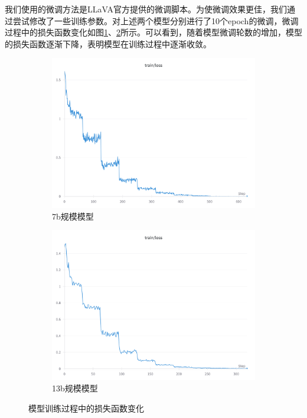 \documentclass[
    linespread = 1.25
]{ctexart}
\begin{document}
我们使用的微调方法是LLaVA官方提供的微调脚本。为使微调效果更佳，我们通过尝试修改了一些训练参数。对上述两个模型分别进行了10个epoch的微调，微调过程中的损失函数变化如图\ref{fig:7b规模模型训练过程中的loss}、\ref{fig:13b规模模型训练过程中的loss}所示。可以看到，随着模型微调轮数的增加，模型的损失函数逐渐下降，表明模型在训练过程中逐渐收敛。
\begin{figure}[H]
  \centering
  \begin{subfigure}{0.49\textwidth}
    \includegraphics[width=\textwidth]{7b.png}
    \caption{7b规模模型}
    \label{fig:7b规模模型训练过程中的loss}
  \end{subfigure}
  \hfill
  \begin{subfigure}{0.49\textwidth}
    \includegraphics[width=\textwidth]{13b.png}
    \caption{13b规模模型}
    \label{fig:13b规模模型训练过程中的loss}
  \end{subfigure}
  \caption{模型训练过程中的损失函数变化}
  \label{fig:模型训练过程中的loss}
\end{figure}
\end{document}

